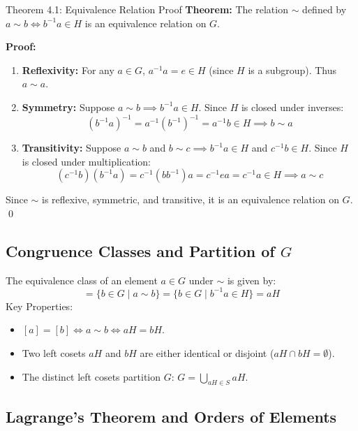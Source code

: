 \documentclass[11pt,a4paper]{article}
\begin{document}
\begin{exbox}{Theorem 4.1: Equivalence Relation Proof}
\textbf{Theorem:} The relation $\sim$ defined by $a \sim b \iff b^{-1}a \in H$ is an equivalence relation on $G$.

\textbf{Proof:}
\begin{enumerate}
    \item \textbf{Reflexivity:} For any $a \in G$, $a^{-1}a = e \in H$ (since $H$ is a subgroup). Thus $a \sim a$.
    \item \textbf{Symmetry:} Suppose $a \sim b \implies b^{-1}a \in H$. Since $H$ is closed under inverses:
    \begin{equation}
        (b^{-1}a)^{-1} = a^{-1}(b^{-1})^{-1} = a^{-1}b \in H \implies b \sim a
    \end{equation}
    \item \textbf{Transitivity:} Suppose $a \sim b$ and $b \sim c \implies b^{-1}a \in H$ and $c^{-1}b \in H$.
    Since $H$ is closed under multiplication:
    \begin{equation}
        (c^{-1}b)(b^{-1}a) = c^{-1}(b b^{-1})a = c^{-1} e a = c^{-1}a \in H \implies a \sim c
    \end{equation}
\end{enumerate}
Since $\sim$ is reflexive, symmetric, and transitive, it is an equivalence relation on $G$. \qed
\end{exbox}

\subsection{Congruence Classes and Partition of $G$}

The equivalence class of an element $a \in G$ under $\sim$ is given by:
\begin{equation}
    [a] = \{ b \in G \mid a \sim b \} = \{ b \in G \mid b^{-1}a \in H \} = aH
\end{equation}
Key Properties:
\begin{itemize}
    \item $[a] = [b] \iff a \sim b \iff aH = bH$.
    \item Two left cosets $aH$ and $bH$ are either identical or disjoint ($aH \cap bH = \emptyset$).
    \item The distinct left cosets partition $G$: $G = \bigcup_{aH \in S} aH$.
\end{itemize}

\subsection{Lagrange's Theorem and Orders of Elements}
\end{document}
